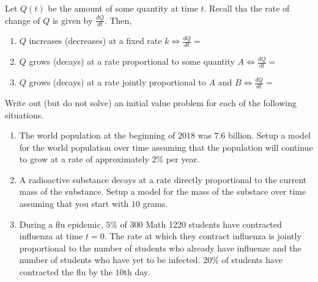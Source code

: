 \documentclass[12pt, a4paper]{article}
\begin{document}
\begin{thrm}
  Let \(Q(t)\) be the amount of some quantity at time \(t\). Recall
  tha the rate of change of \(Q\) is given by \(\frac{dQ}{dt}\). Then,
  \begin{enumerate}
  \item \(Q\) increases (decreases) at a fixed rate \(k \iff
    \frac{dQ}{dt} = \)
  \item \(Q\) grows (decays) at a rate proportional to some quantity \(A \iff
    \frac{dQ}{dt} = \)
  \item \(Q\) grows (decays) at a rate jointly proportional to \(A\) and \(B
    \iff \frac{dQ}{dt} =\)
  \end{enumerate}
\end{thrm}
\vspace{-1in}
\begin{ex}
  Write out (but do not solve) an initial value problem for each of
  the following situations.
  \begin{enumerate}
  \item The world population at the beginning of \(2018\) was \(7.6\)
    billion. Setup a model for the world population over time assuming
    that the 
    population will continue to grow at a 
    rate of approximately \(2\%\) per year.
    \vspace{0.25in}
  \item A radioactive substance decays at a rate directly proportional
    to the current mass of the substance. Setup a model for the mass
    of the substace over time assuming that you start with \(10\)
    grams.
    \vspace{0.25in}
  \item During a flu epidemic, \(5\%\) of \(300\) Math 1220 students
    have contracted influenza at time \(t=0\). The rate at which they
    contract influenza is jointly proportional to the number of
    students who already have influenze and the number of students who
    have yet to be infected. \(20\%\) of students have contracted the
    flu by the \(10\)th day. 
  \end{enumerate}
\end{ex}
\end{document}

